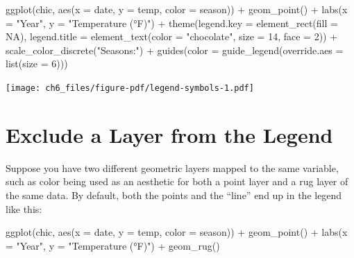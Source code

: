 \documentclass[
  letterpaper,
]{scrbook}
\newenvironment{Shaded}{\begin{snugshade}}{\end{snugshade}}
\newcommand{\AttributeTok}[1]{\textcolor[rgb]{0.40,0.45,0.13}{#1}}
\newcommand{\ConstantTok}[1]{\textcolor[rgb]{0.56,0.35,0.01}{#1}}
\newcommand{\DecValTok}[1]{\textcolor[rgb]{0.68,0.00,0.00}{#1}}
\newcommand{\FunctionTok}[1]{\textcolor[rgb]{0.28,0.35,0.67}{#1}}
\newcommand{\NormalTok}[1]{\textcolor[rgb]{0.00,0.23,0.31}{#1}}
\newcommand{\SpecialCharTok}[1]{\textcolor[rgb]{0.37,0.37,0.37}{#1}}
\newcommand{\StringTok}[1]{\textcolor[rgb]{0.13,0.47,0.30}{#1}}
\begin{document}
\begin{Shaded}
\begin{Highlighting}[]
\FunctionTok{ggplot}\NormalTok{(chic, }\FunctionTok{aes}\NormalTok{(}\AttributeTok{x =}\NormalTok{ date, }\AttributeTok{y =}\NormalTok{ temp, }\AttributeTok{color =}\NormalTok{ season)) }\SpecialCharTok{+}
  \FunctionTok{geom\_point}\NormalTok{() }\SpecialCharTok{+}
  \FunctionTok{labs}\NormalTok{(}\AttributeTok{x =} \StringTok{"Year"}\NormalTok{, }\AttributeTok{y =} \StringTok{"Temperature (°F)"}\NormalTok{) }\SpecialCharTok{+}
  \FunctionTok{theme}\NormalTok{(}\AttributeTok{legend.key =} \FunctionTok{element\_rect}\NormalTok{(}\AttributeTok{fill =} \ConstantTok{NA}\NormalTok{),}
        \AttributeTok{legend.title =} \FunctionTok{element\_text}\NormalTok{(}\AttributeTok{color =} \StringTok{"chocolate"}\NormalTok{,}
                                    \AttributeTok{size =} \DecValTok{14}\NormalTok{, }\AttributeTok{face =} \DecValTok{2}\NormalTok{)) }\SpecialCharTok{+}
  \FunctionTok{scale\_color\_discrete}\NormalTok{(}\StringTok{"Seasons:"}\NormalTok{) }\SpecialCharTok{+}
  \FunctionTok{guides}\NormalTok{(}\AttributeTok{color =} \FunctionTok{guide\_legend}\NormalTok{(}\AttributeTok{override.aes =} \FunctionTok{list}\NormalTok{(}\AttributeTok{size =} \DecValTok{6}\NormalTok{)))}
\end{Highlighting}
\end{Shaded}

\texttt{[image: ch6\_files/figure-pdf/legend-symbols-1.pdf]}

\section{Exclude a Layer from the
Legend}\label{exclude-a-layer-from-the-legend}

Suppose you have two different geometric layers mapped to the same
variable, such as color being used as an aesthetic for both a point
layer and a rug layer of the same data. By default, both the points and
the ``line'' end up in the legend like this:

\begin{Shaded}
\begin{Highlighting}[]
\FunctionTok{ggplot}\NormalTok{(chic, }\FunctionTok{aes}\NormalTok{(}\AttributeTok{x =}\NormalTok{ date, }\AttributeTok{y =}\NormalTok{ temp, }\AttributeTok{color =}\NormalTok{ season)) }\SpecialCharTok{+}
  \FunctionTok{geom\_point}\NormalTok{() }\SpecialCharTok{+}
  \FunctionTok{labs}\NormalTok{(}\AttributeTok{x =} \StringTok{"Year"}\NormalTok{, }\AttributeTok{y =} \StringTok{"Temperature (°F)"}\NormalTok{) }\SpecialCharTok{+}
  \FunctionTok{geom\_rug}\NormalTok{()}
\end{Highlighting}
\end{Shaded}
\end{document}
